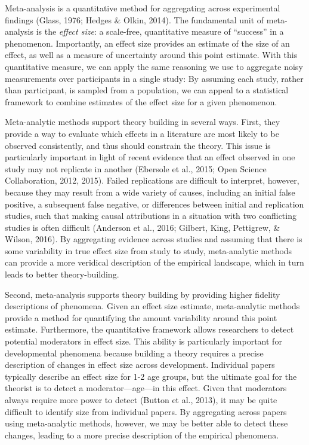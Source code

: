 \documentclass[english,floatsintext,man]{apa6}
\begin{document}
Meta-analysis is a quantitative method for aggregating across
experimental findings (Glass, 1976; Hedges \& Olkin, 2014). The
fundamental unit of meta-analysis is the \emph{effect size}: a
scale-free, quantitative measure of \enquote{success} in a phenomenon.
Importantly, an effect size provides an estimate of the size of an
effect, as well as a measure of uncertainty around this point estimate.
With this quantitative measure, we can apply the same reasoning we use
to aggregate noisy measurements over participants in a single study: By
assuming each study, rather than participant, is sampled from a
population, we can appeal to a statistical framework to combine
estimates of the effect size for a given phenomenon.

Meta-analytic methods support theory building in several ways. First,
they provide a way to evaluate which effects in a literature are most
likely to be observed consistently, and thus should constrain the
theory. This issue is particularly important in light of recent evidence
that an effect observed in one study may not replicate in another
(Ebersole et al., 2015; Open Science Collaboration, 2012, 2015). Failed
replications are difficult to interpret, however, because they may
result from a wide variety of causes, including an initial false
positive, a subsequent false negative, or differences between initial
and replication studies, such that making causal attributions in a
situation with two conflicting studies is often difficult (Anderson et
al., 2016; Gilbert, King, Pettigrew, \& Wilson, 2016). By aggregating
evidence across studies and assuming that there is some variability in
true effect size from study to study, meta-analytic methods can provide
a more veridical description of the empirical landscape, which in turn
leads to better theory-building.

Second, meta-analysis supports theory building by providing higher
fidelity descriptions of phenomena. Given an effect size estimate,
meta-analytic methods provide a method for quantifying the amount
variability around this point estimate. Furthermore, the quantitative
framework allows researchers to detect potential moderators in effect
size. This ability is particularly important for developmental phenomena
because building a theory requires a precise description of changes in
effect size across development. Individual papers typically describe an
effect size for 1-2 age groups, but the ultimate goal for the theorist
is to detect a moderator---age---in this effect. Given that moderators
always require more power to detect (Button et al., 2013), it may be
quite difficult to identify size from individual papers. By aggregating
across papers using meta-analytic methods, however, we may be better
able to detect these changes, leading to a more precise description of
the empirical phenomena.
\end{document}
